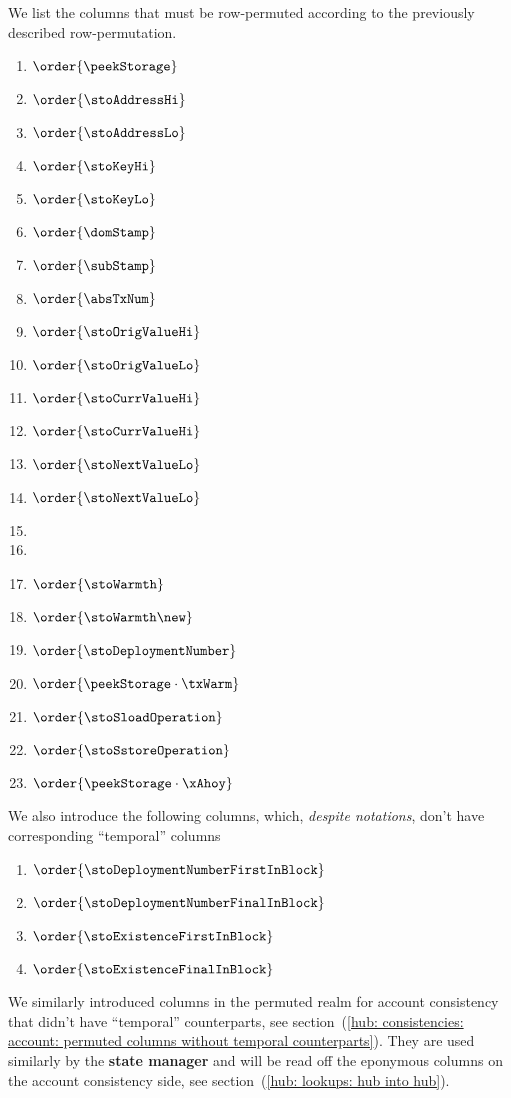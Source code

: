 We list the columns that must be row-permuted according to the previously described row-permutation.
\begin{multicols}{3}
	\begin{enumerate}
		\item $\order{\peekStorage}$
		\item $\order{\stoAddressHi}$
		\item $\order{\stoAddressLo}$
		\item $\order{\stoKeyHi}$
		\item $\order{\stoKeyLo}$
		\item $\order{\domStamp}$
		\item $\order{\subStamp}$
		\item $\order{\absTxNum}$
		\item $\order{\stoOrigValueHi}$
		\item $\order{\stoOrigValueLo}$
		\item $\order{\stoCurrValueHi}$
		\item $\order{\stoCurrValueHi}$
		\item $\order{\stoNextValueLo}$
		\item $\order{\stoNextValueLo}$
		\item[\vspace{\fill}]
		\item[\vspace{\fill}]
		\item $\order{\stoWarmth}$
		\item $\order{\stoWarmth\new}$
		\item $\order{\stoDeploymentNumber}$
		\item $\order{\peekStorage \cdot \txWarm}$
		\item $\order{\stoSloadOperation}$
		\item $\order{\stoSstoreOperation}$
		\item $\order{\peekStorage \cdot \xAhoy}$
	\end{enumerate}
\end{multicols}
We also introduce the following columns, which, \emph{despite notations}, don't have corresponding ``temporal'' columns
\begin{enumerate}
	\item $\order{\stoDeploymentNumberFirstInBlock}$
	\item $\order{\stoDeploymentNumberFinalInBlock}$
	\item $\order{\stoExistenceFirstInBlock}$
	\item $\order{\stoExistenceFinalInBlock}$
\end{enumerate}
\saNote{}
We similarly introduced columns in the permuted realm for account consistency that didn't have ``temporal'' counterparts,
see section~(\ref{hub: consistencies: account: permuted columns without temporal counterparts}).
They are used similarly by the \textbf{state manager} and will be read off the eponymous columns on the account consistency side,
see section~(\ref{hub: lookups: hub into hub}).

